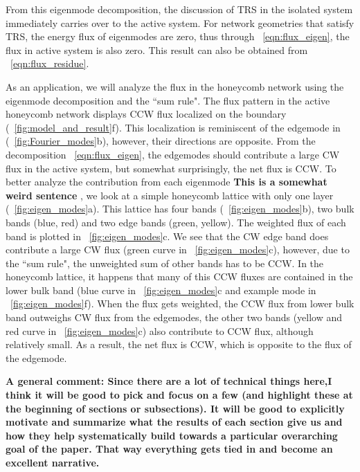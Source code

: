 \documentclass[
 preprint,
 preprintnumbers,
 amsmath,amssymb,
 aps,
 pre,
 longbibliography,
 10pt, twocolumn
]{revtex4-1}
\begin{document}
From this eigenmode decomposition, the discussion of TRS in the isolated system \cite{Nash2015TopologicalMetamaterials} immediately carries over to the active system. For network geometries that satisfy TRS, the energy flux of eigenmodes are zero, thus through \eqnname~\eqref{eqn:flux_eigen}, the flux in active system is also zero. This result can also be obtained from \eqnname~\eqref{eqn:flux_residue}.

As an application, we will analyze the flux in the honeycomb network using the eigenmode decomposition and the ``sum rule".
The flux pattern in the active honeycomb network displays CCW flux localized on the boundary (\figurename~\ref{fig:model_and_result}f). This localization is reminiscent of the edgemode in \cite{Nash2015TopologicalMetamaterials} (\figurename~\ref{fig:Fourier_modes}b), however, their directions are opposite.
From the decomposition \eqnname~\eqref{eqn:flux_eigen}, the edgemodes should contribute a large CW flux in the active system, but somewhat surprisingly, the net flux is CCW.
To better analyze the contribution from each eigenmode {\bf This is a somewhat weird sentence }, we look at a simple honeycomb lattice with only one layer (\figurename~\ref{fig:eigen_modes}a).
This lattice has four bands (\figurename~\ref{fig:eigen_modes}b), two bulk bands (blue, red) and two edge bands (green, yellow). The weighted flux of each band is plotted in \figurename~\ref{fig:eigen_modes}c. We see that the CW edge band does contribute a large CW flux (green curve in \figurename~\ref{fig:eigen_modes}c), however, due to the ``sum rule", the unweighted sum of other bands has to be CCW. In the honeycomb lattice, it happens that many of this CCW fluxes are contained in the lower bulk band (blue curve in \figurename~\ref{fig:eigen_modes}c and example mode in \figurename~\ref{fig:eigen_modes}f). When the flux gets weighted, the CCW flux from lower bulk band outweighs CW flux from the edgemodes, the other two bands (yellow and red curve in \figurename~\ref{fig:eigen_modes}c) also contribute to CCW flux, although relatively small. As a result, the net flux is CCW, which is opposite to the flux of the edgemode.


{\bf A general comment: Since there are a lot of technical things here,I think it will be good to pick and focus on a few (and highlight these at the beginning of sections or subsections). It will be good to explicitly motivate and summarize what the results of each section give us and how they help systematically build towards a particular overarching goal of the paper. That way everything gets tied in and become an excellent narrative. }
\end{document}
